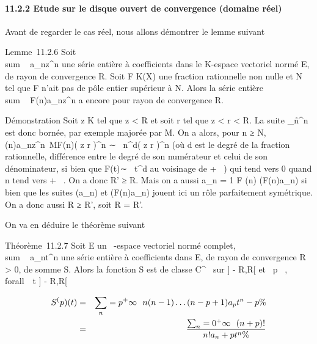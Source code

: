 \documentclass[]{article}
\begin{document}
\paragraph{11.2.2 Etude sur le disque ouvert de convergence (domaine
réel)}

Avant de regarder le cas réel, nous allons démontrer le lemme suivant

Lemme~11.2.6 Soit \\sum ~
a_nz^n une série entière à coefficients dans le
K-espace vectoriel normé E, de rayon de convergence R. Soit F \in K(X) une
fraction rationnelle non nulle et N \in {}~ tel que F n'ait pas de pôle
entier supérieur à N. Alors la série entière
\\sum ~
F(n)a_nz^n a encore pour rayon de convergence R.

Démonstration Soit z \in K tel que z < R et
soit r tel que z < r < R. La
suite
\a_n\r^n
est donc bornée, par exemple majorée par M. On a alors, pour n ≥ N,
\F(n)a_nz^n\
\leq MF(n)\left (
z \over r \right
)^n ∼ \lambda~n^d\left (
z \over r \right
)^n (où d est le degré de la fraction rationnelle, différence
entre le degré de son numérateur et celui de son dénominateur, si bien
que F(t)∼ \lambda~t^d au voisinage de + \infty~) qui
tend vers 0 quand n tend vers + \infty~. On a donc R' ≥ R. Mais on a aussi
a_n = 1 \over F (n)\left
(F(n)a_n\right ) si bien que les suites
(a_n) et (F(n)a_n) jouent ici un rôle parfaitement
symétrique. On a donc aussi R ≥ R', soit R = R'.

On va en déduire le théorème suivant

Théorème~11.2.7 Soit E un ~-espace vectoriel normé complet,
\\sum ~
a_nt^n une série entière à coefficients dans E, de
rayon de convergence R > 0, de somme S. Alors la fonction S
est de classe C^\infty~ sur ] - R,R[ et
\forall~p \in {}~, \\forall~~t \in] -
R,R[

\begin{align*} S^(p)(t)& =&
\sum _n=p^+\infty~~n(n -
1)\ldots(n - p + 1)a_
pt^n-p\%& \\ & =&
\sum _n=0^+\infty~~ (n + p)!
\over n! a_n+pt^n \%&
\\ \end{align*}
\end{document}
